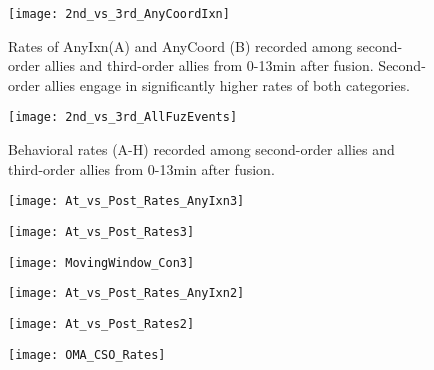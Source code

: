 \documentclass[11pt]{amsart}
\begin{document}
\begin{figure}
  \centering
    \texttt{[image: 2nd\_vs\_3rd\_AnyCoordIxn]}
  \caption{Rates of AnyIxn(A) and AnyCoord (B) recorded among second-order allies and third-order allies from 0-13min after fusion. Second-order allies engage in significantly higher rates of both categories.}
  \label{fig:anyIxn}
\end{figure}

\begin{figure}
  \centering
    \texttt{[image: 2nd\_vs\_3rd\_AllFuzEvents]}
	\caption{Behavioral rates (A-H) recorded among second-order allies and third-order allies from 0-13min after fusion.}
  \label{fig:AllEvents}
\end{figure}

\begin{figure}
  \centering
    \texttt{[image: At\_vs\_Post\_Rates\_AnyIxn3]}
  \caption{} %
  \label{fig:anyIxn3}
\end{figure}

\begin{figure}
  \centering
    \texttt{[image: At\_vs\_Post\_Rates3]}
  \caption{} %
  \label{fig:behRates3}
\end{figure}

\begin{figure}
  \centering
    \texttt{[image: MovingWindow\_Con3]}
  \caption{} %
  \label{fig:Con3}
\end{figure}

\begin{figure}
  \centering
    \texttt{[image: At\_vs\_Post\_Rates\_AnyIxn2]}
  \caption{} %
  \label{fig:anyIxn2}
\end{figure}

\begin{figure}
  \centering
    \texttt{[image: At\_vs\_Post\_Rates2]}
  \caption{} %
  \label{fig:behRates3}
\end{figure}

\begin{figure}
  \centering
    \texttt{[image: OMA\_CSO\_Rates]}
  \caption{} %
  \label{fig:oma_cso}
\end{figure}


\clearpage


\clearpage



\end{document}
